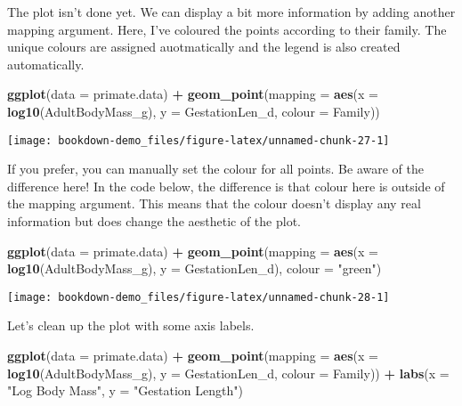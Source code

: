 \documentclass[]{book}
\newenvironment{Shaded}{\begin{snugshade}}{\end{snugshade}}
\newcommand{\KeywordTok}[1]{\textcolor[rgb]{0.13,0.29,0.53}{\textbf{#1}}}
\newcommand{\DataTypeTok}[1]{\textcolor[rgb]{0.13,0.29,0.53}{#1}}
\newcommand{\StringTok}[1]{\textcolor[rgb]{0.31,0.60,0.02}{#1}}
\newcommand{\OperatorTok}[1]{\textcolor[rgb]{0.81,0.36,0.00}{\textbf{#1}}}
\newcommand{\NormalTok}[1]{#1}
\begin{document}
The plot isn't done yet. We can display a bit more information by adding
another mapping argument. Here, I've coloured the points according to
their family. The unique colours are assigned auotmatically and the
legend is also created automatically.

\begin{Shaded}
\begin{Highlighting}[]
\KeywordTok{ggplot}\NormalTok{(}\DataTypeTok{data =}\NormalTok{ primate.data) }\OperatorTok{+}
\StringTok{  }\KeywordTok{geom_point}\NormalTok{(}\DataTypeTok{mapping =} \KeywordTok{aes}\NormalTok{(}\DataTypeTok{x =} \KeywordTok{log10}\NormalTok{(AdultBodyMass_g), }\DataTypeTok{y =}\NormalTok{ GestationLen_d, }
                           \DataTypeTok{colour =}\NormalTok{ Family))}
\end{Highlighting}
\end{Shaded}

\begin{center}\texttt{[image: bookdown-demo\_files/figure-latex/unnamed-chunk-27-1]} \end{center}

If you prefer, you can manually set the colour for all points. Be aware
of the difference here! In the code below, the difference is that colour
here is outside of the mapping argument. This means that the colour
doesn't display any real information but does change the aesthetic of
the plot.

\begin{Shaded}
\begin{Highlighting}[]
\KeywordTok{ggplot}\NormalTok{(}\DataTypeTok{data =}\NormalTok{ primate.data) }\OperatorTok{+}
\StringTok{  }\KeywordTok{geom_point}\NormalTok{(}\DataTypeTok{mapping =} \KeywordTok{aes}\NormalTok{(}\DataTypeTok{x =} \KeywordTok{log10}\NormalTok{(AdultBodyMass_g), }\DataTypeTok{y =}\NormalTok{ GestationLen_d),}
             \DataTypeTok{colour =} \StringTok{"green"}\NormalTok{)}
\end{Highlighting}
\end{Shaded}

\begin{center}\texttt{[image: bookdown-demo\_files/figure-latex/unnamed-chunk-28-1]} \end{center}

Let's clean up the plot with some axis labels.

\begin{Shaded}
\begin{Highlighting}[]
\KeywordTok{ggplot}\NormalTok{(}\DataTypeTok{data =}\NormalTok{ primate.data) }\OperatorTok{+}
\StringTok{  }\KeywordTok{geom_point}\NormalTok{(}\DataTypeTok{mapping =} \KeywordTok{aes}\NormalTok{(}\DataTypeTok{x =} \KeywordTok{log10}\NormalTok{(AdultBodyMass_g), }\DataTypeTok{y =}\NormalTok{ GestationLen_d,}
                           \DataTypeTok{colour =}\NormalTok{ Family)) }\OperatorTok{+}
\StringTok{  }\KeywordTok{labs}\NormalTok{(}\DataTypeTok{x =} \StringTok{"Log Body Mass"}\NormalTok{, }\DataTypeTok{y =} \StringTok{"Gestation Length"}\NormalTok{)}
\end{Highlighting}
\end{Shaded}
\end{document}
